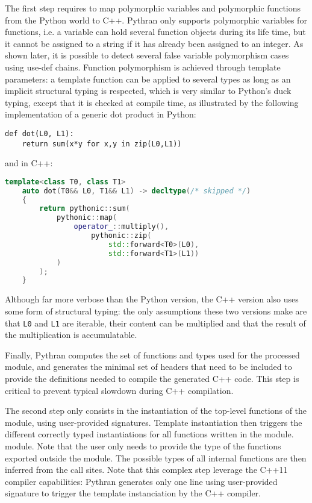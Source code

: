 \documentclass[10pt, onecolumn, preprint]{sigplanconf}
\begin{document}
The first step requires to map polymorphic variables and polymorphic functions
from the Python world to C++. Pythran only supports polymorphic variables for
functions, i.e. a variable can hold several function objects during its life
time, but it cannot be assigned to a string if it has already been assigned to
an integer. %
As shown later, it is possible to detect several false variable
polymorphism cases using use-def chains. Function polymorphism is achieved
through template parameters: a template function can be applied to several
types as long as an implicit structural typing is respected, which is very
similar to Python's duck typing, except that it is checked at compile time, as
illustrated by the following implementation of a generic dot product in Python:

\begin{lstlisting}
def dot(L0, L1):
    return sum(x*y for x,y in zip(L0,L1))
\end{lstlisting}

\noindent and in C++:

\begin{lstlisting}[language=c++]
template<class T0, class T1>
    auto dot(T0&& L0, T1&& L1) -> decltype(/* skipped */)
    {
        return pythonic::sum(
            pythonic::map(
                operator_::multiply(),
                    pythonic::zip(
                        std::forward<T0>(L0),
                        std::forward<T1>(L1))
            )
        );
    }
\end{lstlisting}

Although far more verbose %
than the Python version, the C++ version also uses some
form of structural typing: the only assumptions these two versions make are that
\texttt{L0} and \texttt{L1} are iterable, their content can be multiplied and 
that the result of the multiplication is accumulatable.

Finally, Pythran computes the set of functions and types used for the processed
module, and generates the minimal set of headers that need to be included to
provide the definitions needed to compile the generated C++ code. This step is
critical to prevent typical slowdown during C++ compilation.

The second step only consists in the instantiation of the top-level functions of
the module, using user-provided signatures. Template instantiation then triggers
the different correctly typed instantiations for all functions written in the
module. %
module. Note that the user only needs to provide the type of the functions
exported outside the module. The possible types of all internal functions are
then inferred from the call sites. Note that this complex step leverage the 
C++11 compiler capabilities: Pythran generates only one line using user-provided
signature to trigger the template instanciation by the C++ compiler.
\end{document}
